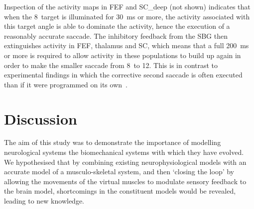 \documentclass{frontiersSCNS}
\begin{document}
Inspection of the activity maps in FEF and SC\_deep (not shown)
indicates that when the 8\dg~target is illuminated for 30~ms or more,
the activity associated with this target angle is able to dominate the
activity, hence the execution of a reasonably accurate saccade. The
inhibitory feedback from the SBG then extinguishes activity in FEF,
thalamus and SC, which means that a full 200~ms or more is required to
allow activity in these populations to build up again in order to make
the smaller saccade from 8\dg~to 12\dg. This is in contrast to
experimental findings in which the corrective second saccade is often
executed  than if it were programmed on its
own~\citep{becker_analysis_1979}.


\section{Discussion} \label{sec:discussion}

The aim of this study was to demonstrate the importance of modelling
neurological systems  the biomechanical systems
with which they have evolved. We hypothesised that by
combining existing neurophysiological models with an accurate model of
a musculo-skeletal system, and then `closing the loop' by allowing the
movements of the virtual muscles to modulate sensory feedback to the
brain model, shortcomings in the constituent models would be revealed,
leading to new knowledge.
%
\end{document}
